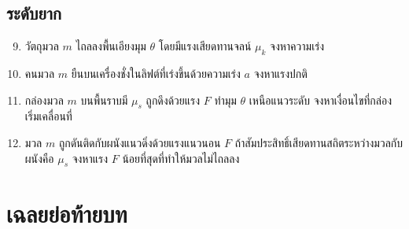 \subsection*{ระดับยาก}

\begin{enumerate}
    \setcounter{enumi}{8}
    \item วัตถุมวล $m$ ไถลลงพื้นเอียงมุม $\theta$ โดยมีแรงเสียดทานจลน์ $\mu_k$ จงหาความเร่ง
    \item คนมวล $m$ ยืนบนเครื่องชั่งในลิฟต์ที่เร่งขึ้นด้วยความเร่ง $a$ จงหาแรงปกติ
    \item กล่องมวล $m$ บนพื้นราบมี $\mu_s$ ถูกดึงด้วยแรง $F$ ทำมุม $\theta$ เหนือแนวระดับ จงหาเงื่อนไขที่กล่องเริ่มเคลื่อนที่
    \item มวล $m$ ถูกดันติดกับผนังแนวดิ่งด้วยแรงแนวนอน $F$ ถ้าสัมประสิทธิ์เสียดทานสถิตระหว่างมวลกับผนังคือ $\mu_s$ จงหาแรง $F$ น้อยที่สุดที่ทำให้มวลไม่ไถลลง
\end{enumerate}

\section{เฉลยย่อท้ายบท}

